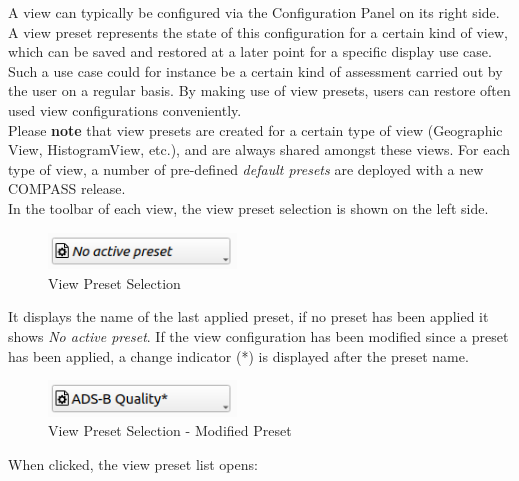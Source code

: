 A view can typically be configured via the Configuration Panel on its right side.
A view preset represents the state of this configuration for a certain kind of view,
which can be saved and restored at a later point for a specific display use case. 
Such a use case could for instance be a certain kind of assessment carried out by the user
on a regular basis. By making use of view presets, users can restore often used view configurations conveniently. \\

Please \textbf{note} that view presets are created for a certain type of view (Geographic View, HistogramView, etc.),
and are always shared amongst these views. For each type of view, a number of pre-defined \textit{default presets} are deployed with a new COMPASS release. \\

In the toolbar of each view, the view preset selection is shown on the left side. 

\begin{figure}[H]
    \center
    \includegraphics[width=5cm]{figures/view_preset_selection.png}
  \caption{View Preset Selection}
\end{figure}

It displays the name of the last applied preset, if no preset has been applied it shows \textit{No active preset}.
If the view configuration has been modified since a preset has been applied, a change indicator (*) is displayed after the preset name.

\begin{figure}[H]
    \center
    \includegraphics[width=5cm]{figures/view_preset_selection_modified.png}
  \caption{View Preset Selection - Modified Preset}
\end{figure}

When clicked, the view preset list opens:

